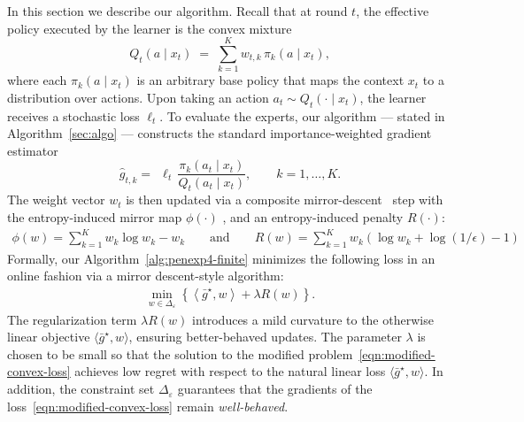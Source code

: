 \documentclass[11pt,letterpaper]{article}
\newcommand{\loss}{\ell}
\theoremstyle{plain}
\theoremstyle{definition}  %
\begin{document}
In this section we describe our algorithm. Recall that at round $t$, the effective policy executed by the learner is the convex mixture
\begin{equation}
Q_t(a \mid x_t)
\;=\;
\sum_{k=1}^K w_{t,k}\,\pi_k(a \mid x_t),
\end{equation}
where each $\pi_k(a \mid x_t)$ is an arbitrary base policy that maps the context $x_t$ 
to a distribution over actions. Upon taking an action $a_t \sim Q_t(\cdot \mid x_t)$, the learner receives a stochastic loss $\loss_t$. To evaluate the experts, our algorithm --- stated in Algorithm~\ref{sec:algo} --- constructs the standard importance-weighted gradient estimator
\begin{equation}
\widehat{g}_{t,k}
=\; \,\loss_t\,\frac{\pi_k(a_t\mid x_t)}{Q_t(a_t\mid x_t)},
\qquad k=1,\ldots,K.
\end{equation}
The weight vector $w_t$ is then updated via a composite mirror-descent~\cite{duchi2011adaptive} step with the entropy-induced mirror map $\phi(\cdot)$ , and an entropy-induced  penalty $R(\cdot)$:
%
\begin{align}
\label{eqn:mirror-map-and-pen}
\phi(w)=\sum_{k = 1}^K w_k\log w_k - w_k \qquad \text{and} \qquad  R(w) =  \sum_{k = 1}^K w_k\left(\log w_k + \log(1/\epsilon) - 1 \right)   
\end{align}
%
Formally, our Algorithm~\ref{alg:penexp4-finite} minimizes the following loss in an online fashion via a mirror descent-style algorithm:
%
\begin{align}
\label{eqn:modified-convex-loss} 
\min_{w \in \Delta_\varepsilon} \left\lbrace
 \left\langle \bar{g}^\star, w \right\rangle + \lambda R(w)
 \right\rbrace. 
\end{align}
%
The regularization term $\lambda R(w)$ introduces a mild curvature to the otherwise linear objective $\langle \bar{g}^\star, w \rangle$, ensuring  better-behaved updates. The parameter $\lambda$ is chosen to be small so that the solution to the modified problem~\eqref{eqn:modified-convex-loss} achieves low regret with respect to the natural linear loss $\langle \bar{g}^\star, w \rangle$. In addition, the constraint set $\Delta_\varepsilon$ guarantees that the gradients of the loss~\eqref{eqn:modified-convex-loss} remain \emph{well-behaved}. 
\end{document}
